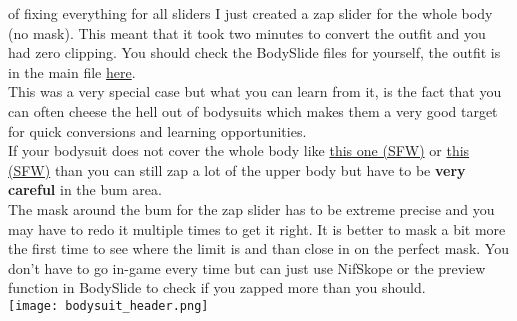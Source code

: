 of fixing everything for all sliders I just created a zap slider for the whole body (no mask). This meant that it took two minutes to 
convert the outfit and you had zero clipping. You should check the BodySlide files for yourself, the outfit is in the main file \href{https://www.nexusmods.com/fallout4/mods/40340}{here}.\\
This was a very special case but what you can learn from it, is the fact that you can often cheese the hell out of bodysuits which 
makes them a very good target for quick conversions and learning opportunities.\\
If your bodysuit does not cover the whole body like \href{https://staticdelivery.nexusmods.com/mods/1151/images/40340/40340-1564484634-253886831.jpeg}{this one (SFW)} 
or \href{https://staticdelivery.nexusmods.com/mods/1151/images/40340/40340-1564484647-1331610882.jpeg}{this (SFW)} than you can still 
zap a lot of the upper body but have to be \textbf{very careful} in the bum area.\\
The mask around the bum for the zap slider has to be extreme precise and you may have to redo it multiple times to get it right. It is 
better to mask a bit more the first time to see where the limit is and than close in on the perfect mask. You don't have to go in-game
every time but can just use NifSkope or the preview function in BodySlide to check if you zapped more than you should.\\
\texttt{[image: bodysuit\_header.png]}